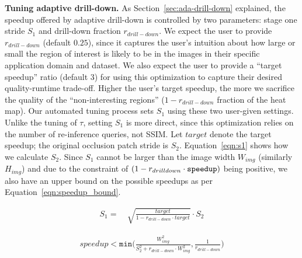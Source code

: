 \vspace{2mm}
\noindent \textbf{Tuning adaptive drill-down.}
As Section~\ref{sec:ada-drill-down} explained, the speedup offered by adaptive drill-down is controlled by two parameters: stage one stride $S_1$ and drill-down fraction $r_{drill-down}$. We expect the user to provide $r_{drill-down}$ (default $0.25$), since it captures the user's intuition about how large or small the region of interest is likely to be in the images in their specific application domain and dataset. We also expect the user to provide a ``target speedup'' ratio (default $3$) for using this optimization to capture their desired quality-runtime trade-off. Higher the user's target speedup, the more we sacrifice the quality of the ``non-interesting regions'' ($1 - r_{drill-down}$ fraction of the heat map). Our automated tuning process sets $S_1$ using these two user-given settings. Unlike the tuning of $\tau$, setting $S_1$ is more direct, since this optimization relies on the number of re-inference queries, not SSIM. Let $\mathit{target}$ denote the target speedup; the original occlusion patch stride is $S_2$. Equation~\ref{eqn:s1} shows how we calculate $S_2$. Since $S_1$ cannot be larger than the image width $W_{img}$ (similarly $H_{img}$) and due to the constraint of $(1-r_{drill\-down} \cdot \texttt{speedup})$ being positive, we also have an upper bound on the possible speedups as per Equation~\ref{eqn:speedup_bound}.

\begin{align}
\label{eqn:s1}
S_1 = &~ \sqrt{\frac{\mathit{target}}{1 - r_{drill-down} \cdot \mathit{target}}} \cdot S_2
\end{align}

\vspace{-2mm}
\begin{align}
\label{eqn:speedup_bound}
\mathit{speedup} < \texttt{min}\Bigg(\frac{W^2_{img}}{S^2_2+r_{drill-down} \cdot W^2_{img}}, \frac{1}{r_{drill-down}}\Bigg)
\end{align}


